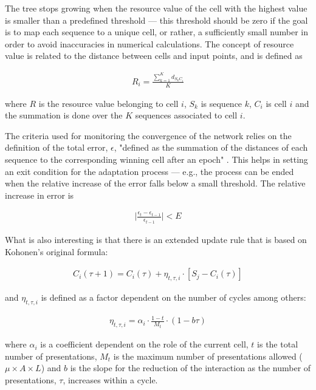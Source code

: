 \documentclass[11pt,twocolumn]{article}
\begin{document}
The tree stops growing when the resource value of the cell with the highest value is smaller than a predefined threshold — this threshold should be zero if the goal is to map each sequence to a unique cell, or rather, a sufficiently small number in order to avoid inaccuracies in numerical calculations. The concept of resource value is related to the distance between cells and input points, and is defined as

\begin{align}
R_i = \frac{\sum_{k = 1}^K d_{S_k C_i}}{K}
\end{align}

where $R$ is the resource value belonging to cell $i$, $S_k$ is sequence $k$, $C_i$ is cell $i$ and the summation is done over the $K$ sequences associated to cell $i$.

The criteria used for monitoring the convergence of the network relies on the definition of the total error, $\epsilon$, "defined as the summation of the distances of each sequence to the corresponding winning cell after an epoch" \cite{Dopazo1997}. This helps in setting an exit condition for the adaptation process — e.g., the process can be ended when the relative increase of the error falls below a small threshold. The relative increase in error is

\begin{align}
\Big|\frac{\epsilon_t - \epsilon_{t-1}}{\epsilon_{t-1}}\Big| < E
\end{align}

What is also interesting is that there is an extended update rule that is based on Kohonen's original formula:

\begin{align}
C_i(\tau + 1) = C_i(\tau) + \eta_{t, \tau, i} \cdot [S_j - C_i(\tau)]
\end{align}

and $\eta_{t, \tau, i}$ is defined as a factor dependent on the number of cycles among others:

\begin{align}
\eta_{t, \tau, i} = \alpha_i \cdot \frac{1 - t}{M_t} \cdot (1 - b\tau)
\end{align}

where $\alpha_i$ is a coefficient dependent on the role of the current cell, $t$ is the total number of presentations, $M_t$ is the maximum number of presentations allowed ($\mu \times A \times L$) and $b$ is the
slope for the reduction of the interaction as the number of presentations, $\tau$, increases within a cycle.
\end{document}
